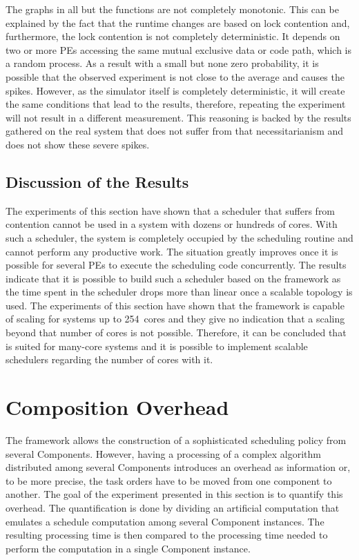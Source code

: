 The graphs in all but the  functions are not completely monotonic. This can be explained by the fact that the runtime changes are based on lock contention and, furthermore, the lock contention is not completely deterministic. It depends on two or more \acp{PE} accessing the same mutual exclusive data or code path, which is a random process. As a result with a small but none zero probability, it is possible that the observed experiment is not close to the average and causes the spikes. However, as the simulator itself is completely deterministic, it will create the same conditions that lead to the results, therefore, repeating the experiment will not result in a different measurement. This reasoning is backed by the results gathered on the real system that does not suffer from that necessitarianism and does not show these severe spikes.\label{sec:studies:scale:results!end}

\subsection{Discussion of the Results}

The experiments of this section have shown that a scheduler that suffers from contention cannot be used in a system with dozens or hundreds of cores. With such a scheduler, the system is completely occupied by the scheduling routine and cannot perform any productive work. The situation greatly improves once it is possible for several \acp{PE} to execute the scheduling code concurrently. The results indicate that it is possible to build such a scheduler based on the \cobas{} framework as the time spent in the scheduler drops more than linear once a scalable topology is used. The experiments of this section have shown that the \cobas{} framework is capable of scaling for systems up to \num{254}~cores and they give no indication that a scaling beyond that number of cores is not possible. Therefore, it can be concluded that \cobas{} is suited for many-core systems and it is possible to implement scalable schedulers regarding the number of cores with it.

\section{Composition Overhead}%
\label{sec:studies:overhead}

The \cobas{} framework allows the construction of a sophisticated scheduling policy from several Components. However, having a processing of a complex algorithm distributed among several Components introduces an overhead as information or, to be more precise, the task orders have to be moved from one component to another. The goal of the experiment presented in this section is to quantify this overhead. The quantification is done by dividing an artificial computation that emulates a schedule computation among several Component instances. The resulting processing time is then compared to the processing time needed to perform the computation in a single Component instance.

